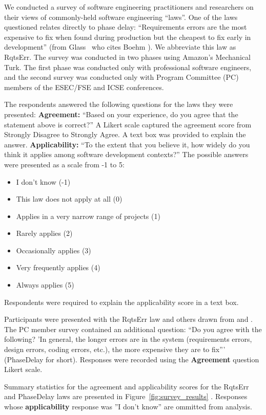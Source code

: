 We conducted a survey of software engineering practitioners and researchers on their views of commonly-held software engineering ``laws''. One of the laws questioned relates directly to phase delay: ``Requirements errors are the most expensive to fix when found during production but the cheapest to fix early in development'' (from Glass~\cite{glass02} who cites Boehm ). We abbreviate this law as RqtsErr. The survey was conducted in two phases using Amazon's Mechanical Turk. The first phase was conducted only with professional software engineers, and the second survey was conducted only with Program Committee (PC) members of the ESEC/FSE and ICSE conferences.

The respondents answered the following questions for the laws they were presented: \newline
\textbf{Agreement:} ``Based on your experience, do you agree that the statement above is correct?'' A Likert scale captured the agreement score from Strongly Disagree to Strongly Agree. A text box was provided to explain the answer. \newline
\textbf{Applicability:} ``To the extent that you believe it, how widely do you think it applies among software development contexts?'' The possible answers were presented as a scale from -1 to 5:
\begin{itemize}
\item I don't know (-1)
\item This law does not apply at all (0)
\item Applies in a very narrow range of projects  (1)
\item Rarely applies (2)
\item Occasionally applies (3)
\item Very frequently applies (4)
\item Always applies (5)
\end{itemize}
Respondents were required to explain the applicability score in a text box.

Participants were presented with the RqtsErr law and others drawn from \cite{glass02} and \cite{endres03}. The PC member survey contained an additional question: ``Do you agree with the following? 'In general, the longer errors are in the system (requirements errors, design errors, coding errors, etc.), the more expensive they are to fix''' (PhaseDelay for short). Responses were recorded using the \textbf{Agreement} question Likert scale. 

Summary statistics for the agreement and applicability scores for the RqtsErr and PhaseDelay laws are presented in Figure~\ref{fig:survey_results} . Responses whose \textbf{applicability} response was ''I don't know'' are ommitted from analysis.


